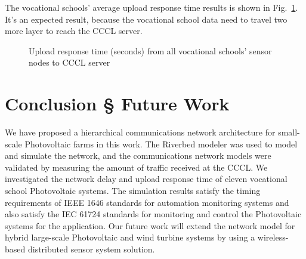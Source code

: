 \documentclass[conference, letterpaper]{IEEEtran}
\begin{document}
The vocational schools' average upload response time results is shown in Fig.~\ref{fig:figure10}. It's an expected result, because the vocational school data need to travel two more layer to reach the CCCL server.  

\begin{figure}[htbp]

\caption{Upload response time (seconds) from all vocational schools' sensor nodes to CCCL server}
\label{fig:figure10}
\end{figure}




\section*{Conclusion § Future Work}

We have proposed a hierarchical communications network architecture for small-scale Photovoltaic farms in this work. The Riverbed modeler was used to model and simulate the network, and the communications network models were validated by measuring the amount of traffic received at the CCCL. We investigated the network delay and upload response time of eleven vocational school Photovoltaic systems. The simulation results satisfy the timing requirements of IEEE 1646 standards for automation monitoring systems and also satisfy the IEC 61724 standards for monitoring and control the Photovoltaic systems for the application. Our future work will extend the network model for hybrid large-scale Photovoltaic and wind turbine systems by using a wireless-based distributed sensor system solution.  
\end{document}
